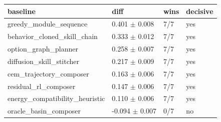 \begin{tabular}{llll}
\toprule
baseline & diff & wins & decisive \\
\midrule
greedy\_module\_sequence & 0.401 $\pm$ 0.008 & 7/7 & yes \\
behavior\_cloned\_skill\_chain & 0.333 $\pm$ 0.012 & 7/7 & yes \\
option\_graph\_planner & 0.258 $\pm$ 0.007 & 7/7 & yes \\
diffusion\_skill\_stitcher & 0.217 $\pm$ 0.009 & 7/7 & yes \\
cem\_trajectory\_composer & 0.163 $\pm$ 0.006 & 7/7 & yes \\
residual\_rl\_composer & 0.147 $\pm$ 0.006 & 7/7 & yes \\
energy\_compatibility\_heuristic & 0.110 $\pm$ 0.006 & 7/7 & yes \\
oracle\_basin\_composer & -0.094 $\pm$ 0.007 & 0/7 & no \\
\bottomrule
\end{tabular}
